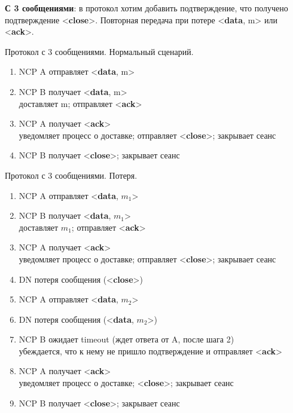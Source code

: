 \newpage
\textbf{С 3 сообщениями}: в протокол хотим добавить подтверждение, что получено подтверждение <\textbf{close}>. Повторная передача при потере <\textbf{data}, m> или <\textbf{ack}>.

\begin{algorithm}
	\caption{Протокол с 3 сообщениями. Нормальный сценарий.}
	\begin{enumerate}
		\item NCP A отправляет <\textbf{data}, m>
		\item NCP B получает <\textbf{data}, m> \\
			доставляет m; отправляет <\textbf{ack}>
		\item NCP A получает <\textbf{ack}> \\
			уведомляет процесс о доставке; отправляет <\textbf{close}>; закрывает сеанс
		\item NCP B получает <\textbf{close}>; закрывает сеанс
	\end{enumerate}
\end{algorithm}

\begin{algorithm}[h!]
	\caption{Протокол с 3 сообщениями. Потеря.}
	\begin{enumerate}
		\item NCP A отправляет <\textbf{data}, $m_1$>
		\item NCP B получает <\textbf{data}, $m_1$> \\
			доставляет $m_1$; отправляет <\textbf{ack}>
		\item NCP A получает <\textbf{ack}> \\
			уведомляет процесс о доставке; отправляет <\textbf{close}>; закрывает сеанс
		\item DN потеря сообщения (<\textbf{close}>)
		\item NCP A отправляет <\textbf{data}, $m_2$>
		\item DN потеря сообщения (<\textbf{data}, $m_2$>)
		\item NCP B ожидает timeout (ждет ответа от A, после шага 2) \\
			убеждается, что к нему не пришло подтверждение  и отправляет <\textbf{ack}>
		\item NCP A получает <\textbf{ack}> \\
			уведомляет процесс о доставке; <\textbf{close}>; закрывает сеанс
		\item NCP B получает <\textbf{close}>; закрывает сеанс
	\end{enumerate}
\end{algorithm}


